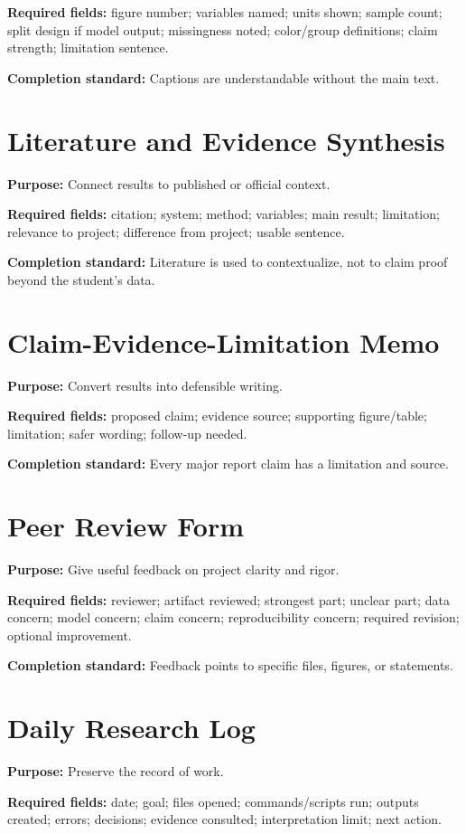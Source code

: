 \textbf{Required fields:} figure number; variables named; units shown; sample count; split design if model output; missingness noted; color/group definitions; claim strength; limitation sentence.

\textbf{Completion standard:} Captions are understandable without the main text.

\section{Literature and Evidence Synthesis}
\textbf{Purpose:} Connect results to published or official context.

\textbf{Required fields:} citation; system; method; variables; main result; limitation; relevance to project; difference from project; usable sentence.

\textbf{Completion standard:} Literature is used to contextualize, not to claim proof beyond the student's data.

\section{Claim-Evidence-Limitation Memo}
\textbf{Purpose:} Convert results into defensible writing.

\textbf{Required fields:} proposed claim; evidence source; supporting figure/table; limitation; safer wording; follow-up needed.

\textbf{Completion standard:} Every major report claim has a limitation and source.

\section{Peer Review Form}
\textbf{Purpose:} Give useful feedback on project clarity and rigor.

\textbf{Required fields:} reviewer; artifact reviewed; strongest part; unclear part; data concern; model concern; claim concern; reproducibility concern; required revision; optional improvement.

\textbf{Completion standard:} Feedback points to specific files, figures, or statements.

\section{Daily Research Log}
\textbf{Purpose:} Preserve the record of work.

\textbf{Required fields:} date; goal; files opened; commands/scripts run; outputs created; errors; decisions; evidence consulted; interpretation limit; next action.

